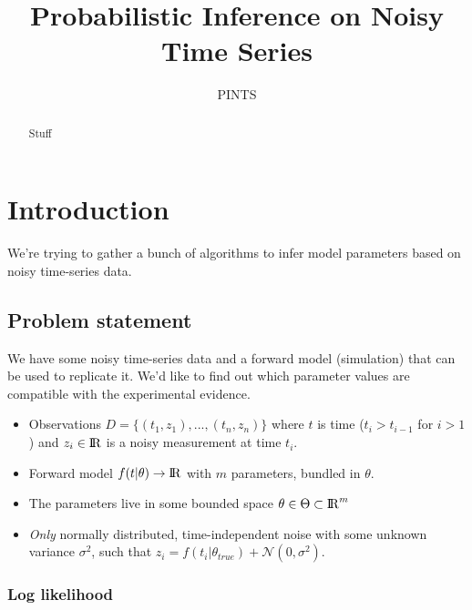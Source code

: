 \documentclass[preprint,authoryear,12pt]{elsarticle}
\newcommand\real{{\rm I\!R}}
\newcommand\normal{\mathcal{N}}
\begin{document}
\begin{frontmatter}

\title{Probabilistic Inference on Noisy Time Series}

\author[csaddress]{PINTS}

\address[csaddress]{Department of Computer Science, University of Oxford,
Wolfson Building, Parks Road, Oxford, OX1 3QD, UK}


%
%
%
%
\begin{abstract}
Stuff
\end{abstract}

\end{frontmatter}


%
%
%
%
\section{Introduction}

We're trying to gather a bunch of algorithms to infer model parameters based
 on noisy time-series data.

%
%
\subsection{Problem statement}

We have some noisy time-series data and a forward model (simulation) that can
 be used to replicate it.
We'd like to find out which parameter values are compatible with the
 experimental evidence.

\begin{itemize}
\item Observations $D = \{(t_1, z_1),...,(t_n, z_n)\}$ where $t$ is time
 ($t_i > t_{i-1}$ for $i > 1$) and $z_i\in\real$ is a noisy measurement at
 time $t_i$.
\item Forward model $f(t|\theta) \to \real$ with $m$ parameters, bundled in
 $\theta$.
\item The parameters live in some bounded space
 $\theta\in\Theta\subset\real^m$
\item \emph{Only} normally distributed, time-independent noise with some
 unknown variance $\sigma^2$, such that
 $z_i = f(t_i|\theta_{true}) + \normal(0, \sigma^2)$.
\end{itemize}

\subsubsection{Log likelihood}
\end{document}
